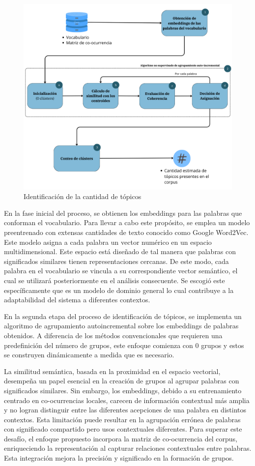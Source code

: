 \begin{figure}[H]
	\centering
	\includegraphics[width=15cm]{k_estimation}
	\caption{Identificaci\'on de la cantidad de t\'opicos}
\end{figure}

En la fase inicial del proceso, se obtienen los embeddings para las palabras que conforman el vocabulario. Para llevar a cabo este propósito, se emplea un modelo preentrenado con extensas cantidades de texto conocido como Google Word2Vec. Este modelo asigna a cada palabra un vector numérico en un espacio multidimensional. Este espacio está diseñado de tal manera que palabras con significados similares tienen representaciones cercanas. De este modo, cada palabra en el vocabulario se vincula a su correspondiente vector semántico, el cual se utilizará posteriormente en el análisis consecuente. Se escogi\'o este espec\'ificamente que es un modelo de dominio general lo cual contribuye a la adaptabilidad del sistema a diferentes contextos. 

En la segunda etapa del proceso de identificación de tópicos, se implementa un algoritmo de agrupamiento autoincremental sobre los embeddings de palabras obtenidos. A diferencia de los métodos convencionales que requieren una predefinición del número de grupos, este enfoque comienza con 0 grupos y estos se construyen dinámicamente a medida que es necesario.

La similitud semántica, basada en la proximidad en el espacio vectorial, desempeña un papel esencial en la creación de grupos al agrupar palabras con significados similares. Sin embargo, los embeddings, debido a su entrenamiento centrado en co-ocurrencias locales, carecen de información contextual más amplia y no logran distinguir entre las diferentes acepciones de una palabra en distintos contextos. Esta limitación puede resultar en la agrupación errónea de palabras con significado compartido pero usos contextuales diferentes. Para superar este desafío, el enfoque propuesto incorpora la matriz de co-ocurrencia del corpus, enriqueciendo la representación al capturar relaciones contextuales entre palabras. Esta integración mejora la precisión y significado en la formación de grupos.

